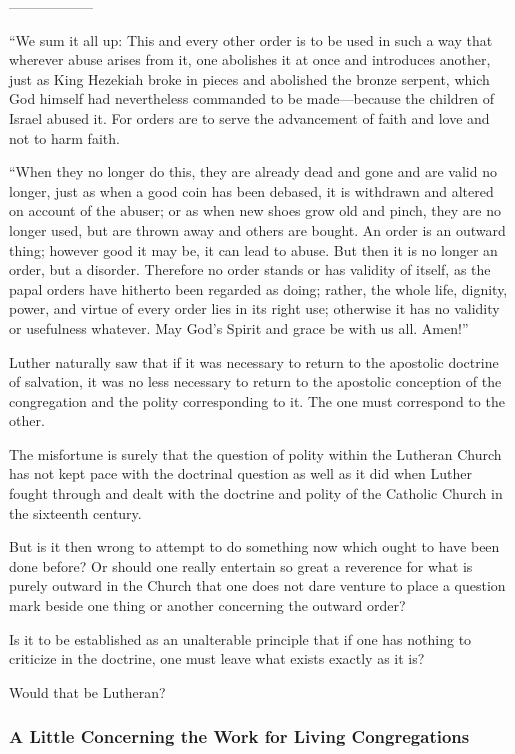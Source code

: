 ——————

“We sum it all up: This and every other order is to be used in such a way that wherever abuse arises from it, one abolishes it at once and introduces another, just as King Hezekiah broke in pieces and abolished the bronze serpent, which God himself had nevertheless commanded to be made—because the children of Israel abused it. For orders are to serve the advancement of faith and love and not to harm faith.

“When they no longer do this, they are already dead and gone and are valid no longer, just as when a good coin has been debased, it is withdrawn and altered on account of the abuser; or as when new shoes grow old and pinch, they are no longer used, but are thrown away and others are bought. An order is an outward thing; however good it may be, it can lead to abuse. But then it is no longer an order, but a disorder. Therefore no order stands or has validity of itself, as the papal orders have hitherto been regarded as doing; rather, the whole life, dignity, power, and virtue of every order lies in its right use; otherwise it has no validity or usefulness whatever. May God’s Spirit and grace be with us all. Amen!”

Luther naturally saw that if it was necessary to return to the apostolic doctrine of salvation, it was no less necessary to return to the apostolic conception of the congregation and the polity corresponding to it. The one must correspond to the other.

The misfortune is surely that the question of polity within the Lutheran Church has not kept pace with the doctrinal question as well as it did when Luther fought through and dealt with the doctrine and polity of the Catholic Church in the sixteenth century.

But is it then wrong to attempt to do something now which ought to have been done before? Or should one really entertain so great a reverence for what is purely outward in the Church that one does not dare venture to place a question mark beside one thing or another concerning the outward order?

Is it to be established as an unalterable principle that if one has nothing to criticize in the doctrine, one must leave what exists exactly as it is?

Would that be Lutheran?

\subsubsection{A Little Concerning the Work for Living Congregations}

